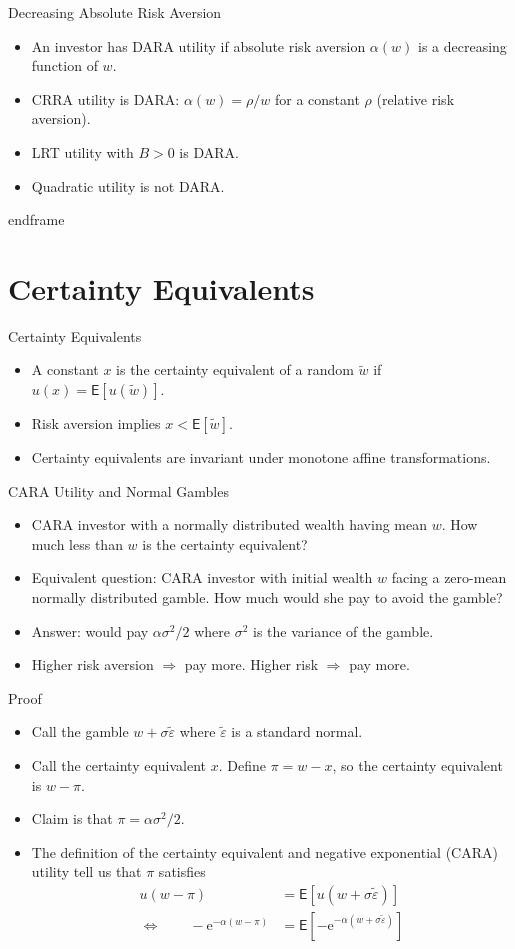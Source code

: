 \documentclass[10pt]{beamer}
\newcommand{\bi}{\begin{itemize}}
\newcommand{\ei}{\end{itemize}}
\newcommand{\im}{\item}
\newcommand{\E}{\mathrm{e}}
\newcommand{\mye}{\ensuremath{\mathsf{E}}}
\newcommand{\tve}{\tilde{\varepsilon}}
\begin{document}
  \begin{frame}{Decreasing Absolute Risk Aversion}
    \bi
    \im An investor has DARA utility if absolute risk aversion $\alpha(w)$ is a decreasing function of $w$.
    \im CRRA utility is DARA: $\alpha(w) = \rho/w$ for a constant $\rho$ (relative risk aversion).
    \im LRT utility with $B>0$ is DARA.
    \im Quadratic utility is not DARA.
    \ei
    end{frame}


\section{Certainty Equivalents}

\begin{frame}{Certainty Equivalents}
  \bi
  \im A constant $x$ is the certainty equivalent of a random $\tilde{w}$ if $u(x) = \mye[u(\tilde{w})]$.  
\im Risk aversion implies $x<\mye[\tilde{w}]$.
\im Certainty equivalents are invariant under monotone affine transformations.
\ei
\end{frame}

\begin{frame}{CARA Utility and Normal Gambles}
  \bi
  \im CARA investor with a normally distributed wealth having mean $w$. How much less than $w$ is the certainty equivalent?
  \im Equivalent question: CARA investor with initial wealth $w$ facing a \alert{zero-mean} normally distributed gamble.  How much would she pay to avoid the gamble?
  \im Answer: would pay $\alpha \sigma^2/2$ where $\sigma^2$ is the variance of the gamble.
  \im Higher risk aversion $\Rightarrow$ pay more.  Higher risk $\Rightarrow$ pay more.
  \ei
\end{frame}

\begin{frame}{Proof}
  \bi
   \im Call the gamble $w + \sigma \tve$ where $\tve$ is a standard normal.
   \im Call the certainty equivalent $x$.  Define $\pi = w-x$, so the certainty equivalent is $w-\pi$.
   \im Claim is that $\pi = \alpha\sigma^2/2$.
   \pause
   \im The definition of the certainty equivalent and negative exponential (CARA) utility tell us that $\pi$ satisfies
  \begin{align*}
  u(w-\pi) &= \mye\left[u(w+\sigma\tilde{\varepsilon})\right] \\
   \Leftrightarrow \qquad -\E^{-\alpha(w-\pi)} &= \mye\left[-\E^{-\alpha(w+\sigma\tilde{\varepsilon})}\right]
  \end{align*} 
  \ei
\end{frame} 


\end{frame}
\end{document}
